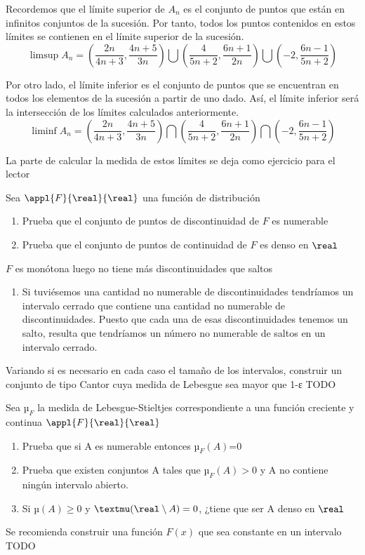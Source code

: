 \begin{problem}
Recordemos que el límite superior de $A_n$ es el conjunto de puntos que están en infinitos conjuntos de la sucesión. Por tanto, todos los puntos contenidos en estos límites se contienen en el límite superior de la sucesión.
\[\limsup A_n = \left(\frac{2n}{4n+3}, \frac{4n+5}{3n}\right) \bigcup  \left(\frac{4}{5n+2}, \frac{6n+1}{2n}\right) \bigcup \left(-2, \frac{6n-1}{5n+2}\right)\]

Por otro lado, el límite inferior es el conjunto de puntos que se encuentran en todos los elementos de la sucesión a partir de uno dado. Así, el límite inferior será la intersección de los límites calculados anteriormente.
\[\liminf A_n = \left(\frac{2n}{4n+3}, \frac{4n+5}{3n}\right) \bigcap  \left(\frac{4}{5n+2}, \frac{6n+1}{2n}\right) \bigcap \left(-2, \frac{6n-1}{5n+2}\right)\]

La parte de calcular la medida de estos límites se deja como ejercicio para el lector
\end{problem}

\begin{problem}
Sea $\appl{F}{\real}{\real}$ una función de distribución
\begin{enumerate}
\item Prueba que el conjunto de puntos de discontinuidad de $F$ es numerable
\item Prueba que el conjunto de puntos de continuidad de $F$ es denso en $\real$
\end{enumerate}
\obs $F$ es monótona luego no tiene más discontinuidades que saltos
\solution
\begin{enumerate}
\item Si tuviésemos una cantidad no numerable de discontinuidades tendríamos un intervalo cerrado que contiene una cantidad no numerable de discontinuidades. Puesto que cada una de esas discontinuidades tenemos un salto, resulta que tendríamos un número no numerable de saltos en un intervalo cerrado.

\end{enumerate}
\end{problem}

\begin{problem}
Variando si es necesario en cada caso el tamaño de los intervalos, construir un conjunto de tipo Cantor cuya medida de Lebesgue sea mayor que 1-ε
\solution
TODO
\end{problem}

\begin{problem}
Sea $µ_F$ la medida de Lebesgue-Stieltjes correspondiente a una función creciente y continua $\appl{F}{\real}{\real}$
\begin{enumerate}
\item Prueba que si A es numerable entonces $µ_F(A)$=0
\item Prueba que existen conjuntos A tales que $µ_F(A)> 0$ y A no contiene ningún intervalo abierto.
\item Si $µ(A)\geq 0$ y $µ(\real \setminus A) = 0$, ¿tiene que ser A denso en $\real$
\end{enumerate}
\obs Se recomienda construir una función $F(x)$ que sea constante en un intervalo
\solution
TODO
\end{problem}

